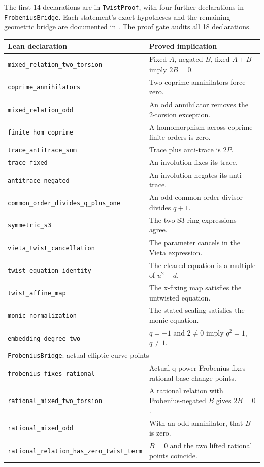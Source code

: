 \documentclass[10pt]{article}
\begin{document}
The first 14 declarations are in \texttt{TwistProof}, with four further
declarations in \texttt{FrobeniusBridge}. Each statement's exact
hypotheses and the remaining geometric bridge are documented in
. The proof gate audits all 18 declarations.

\begin{center}\small
\begin{tabular}{lp{3.3in}}
\toprule
Lean declaration & Proved implication \\\midrule
\texttt{mixed\_relation\_two\_torsion} & Fixed $A$, negated $B$, fixed $A+B$ imply $2B=0$. \\
\texttt{coprime\_annihilators} & Two coprime annihilators force zero. \\
\texttt{mixed\_relation\_odd} & An odd annihilator removes the 2-torsion exception. \\
\texttt{finite\_hom\_coprime} & A homomorphism across coprime finite orders is zero. \\
\texttt{trace\_antitrace\_sum} & Trace plus anti-trace is $2P$. \\
\texttt{trace\_fixed} & An involution fixes its trace. \\
\texttt{antitrace\_negated} & An involution negates its anti-trace. \\
\texttt{common\_order\_divides\_q\_plus\_one} & An odd common order divisor divides $q+1$. \\
\texttt{symmetric\_s3} & The two S3 ring expressions agree. \\
\texttt{vieta\_twist\_cancellation} & The parameter cancels in the Vieta expression. \\
\texttt{twist\_equation\_identity} & The cleared equation is a multiple of $u^2-d$. \\
\texttt{twist\_affine\_map} & The x-fixing map satisfies the untwisted equation. \\
\texttt{monic\_normalization} & The stated scaling satisfies the monic equation. \\
\texttt{embedding\_degree\_two} & $q=-1$ and $2\ne0$ imply $q^2=1$, $q\ne1$. \\
\midrule
\multicolumn{2}{l}{\texttt{FrobeniusBridge}: actual elliptic-curve points} \\
\texttt{frobenius\_fixes\_rational} & Actual q-power Frobenius fixes rational base-change points. \\
\texttt{rational\_mixed\_two\_torsion} & A rational relation with Frobenius-negated $B$ gives $2B=0$. \\
\texttt{rational\_mixed\_odd} & With an odd annihilator, that $B$ is zero. \\
\texttt{rational\_relation\_has\_zero\_twist\_term} & $B=0$ and the two lifted rational points coincide. \\
\bottomrule
\end{tabular}\normalsize\end{center}
\end{document}
